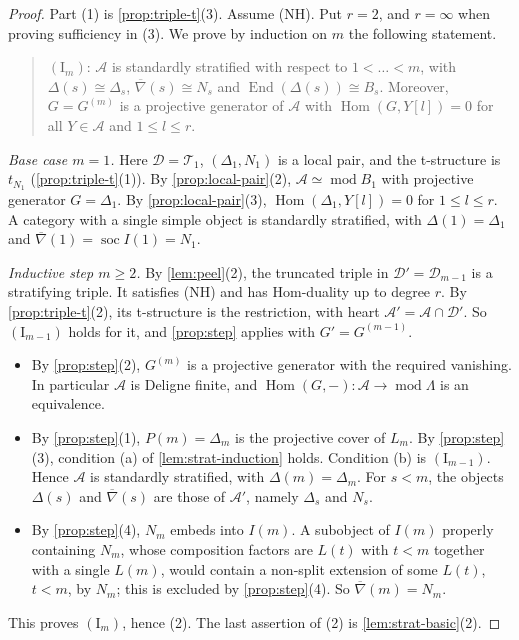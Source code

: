 \documentclass[11pt,reqno]{amsart}
\theoremstyle{plain}
\theoremstyle{definition}
\theoremstyle{remark}
\DeclareMathOperator{\Hom}{Hom}
\DeclareMathOperator{\End}{End}
\DeclareMathOperator{\soc}{soc}
\newcommand{\modd}{\operatorname{mod}}
\newcommand{\nablabar}{\overline{\nabla}}
\newcommand{\cD}{\mathcal{D}}
\newcommand{\cA}{\mathcal{A}}
\newcommand{\cT}{\mathcal{T}}
\begin{document}
\begin{proof}
Part (1) is \cref{prop:triple-t}(3). Assume (NH). Put $r=2$, and $r=\infty$ when proving sufficiency in (3). We prove by induction on $m$ the following statement.
\begin{quote}
$(\mathrm I_m)$: $\cA$ is standardly stratified with respect to $1<\dots<m$, with $\Delta(s)\cong\Delta_s$, $\nablabar(s)\cong N_s$ and $\End(\Delta(s))\cong B_s$. Moreover, $G=G^{(m)}$ is a projective generator of $\cA$ with $\Hom(G,Y[l])=0$ for all $Y\in\cA$ and $1\le l\le r$.
\end{quote}

\emph{Base case $m=1$.} Here $\cD=\cT_1$, $(\Delta_1,N_1)$ is a local pair, and the t-structure is $t_{N_1}$ (\cref{prop:triple-t}(1)). By \cref{prop:local-pair}(2), $\cA\simeq\modd B_1$ with projective generator $G=\Delta_1$. By \cref{prop:local-pair}(3), $\Hom(\Delta_1,Y[l])=0$ for $1\le l\le r$. A category with a single simple object is standardly stratified, with $\Delta(1)=\Delta_1$ and $\nablabar(1)=\soc I(1)=N_1$.

\emph{Inductive step $m\ge2$.} By \cref{lem:peel}(2), the truncated triple in $\cD'=\cD_{m-1}$ is a stratifying triple. It satisfies (NH) and has Hom-duality up to degree $r$. By \cref{prop:triple-t}(2), its t-structure is the restriction, with heart $\cA'=\cA\cap\cD'$. So $(\mathrm I_{m-1})$ holds for it, and \cref{prop:step} applies with $G'=G^{(m-1)}$.
\begin{itemize}
\item By \cref{prop:step}(2), $G^{(m)}$ is a projective generator with the required vanishing. In particular $\cA$ is Deligne finite, and $\Hom(G,-)\colon\cA\to\modd\Lambda$ is an equivalence.
\item By \cref{prop:step}(1), $P(m)=\Delta_m$ is the projective cover of $L_m$. By \cref{prop:step}(3), condition (a) of \cref{lem:strat-induction} holds. Condition (b) is $(\mathrm I_{m-1})$. Hence $\cA$ is standardly stratified, with $\Delta(m)=\Delta_m$. For $s<m$, the objects $\Delta(s)$ and $\nablabar(s)$ are those of $\cA'$, namely $\Delta_s$ and $N_s$.
\item By \cref{prop:step}(4), $N_m$ embeds into $I(m)$. A subobject of $I(m)$ properly containing $N_m$, whose composition factors are $L(t)$ with $t<m$ together with a single $L(m)$, would contain a non-split extension of some $L(t)$, $t<m$, by $N_m$; this is excluded by \cref{prop:step}(4). So $\nablabar(m)=N_m$.
\end{itemize}
This proves $(\mathrm I_m)$, hence (2). The last assertion of (2) is \cref{lem:strat-basic}(2).


\end{proof}
\end{document}
